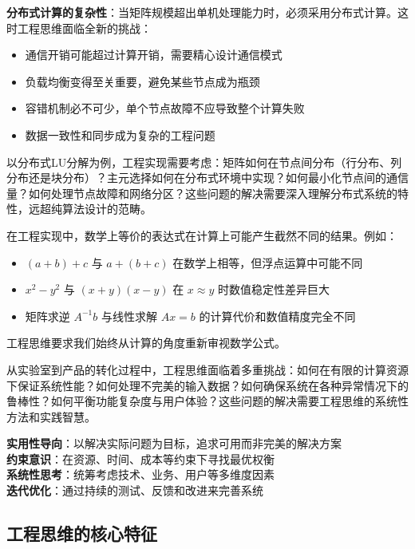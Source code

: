 \textbf{分布式计算的复杂性}：当矩阵规模超出单机处理能力时，必须采用分布式计算。这时工程思维面临全新的挑战：
\begin{itemize}
\item 通信开销可能超过计算开销，需要精心设计通信模式
\item 负载均衡变得至关重要，避免某些节点成为瓶颈
\item 容错机制必不可少，单个节点故障不应导致整个计算失败
\item 数据一致性和同步成为复杂的工程问题
\end{itemize}

以分布式LU分解为例，工程实现需要考虑：矩阵如何在节点间分布（行分布、列分布还是块分布）？主元选择如何在分布式环境中实现？如何最小化节点间的通信量？如何处理节点故障和网络分区？这些问题的解决需要深入理解分布式系统的特性，远超纯算法设计的范畴。

\begin{tcolorbox}[colback=red!5!white,colframe=red!75!black,title=警示：数学等价≠计算等价]
在工程实现中，数学上等价的表达式在计算上可能产生截然不同的结果。例如：
\begin{itemize}
\item $(a+b)+c$ 与 $a+(b+c)$ 在数学上相等，但浮点运算中可能不同
\item $x^2-y^2$ 与 $(x+y)(x-y)$ 在 $x \approx y$ 时数值稳定性差异巨大
\item 矩阵求逆 $A^{-1}b$ 与线性求解 $Ax=b$ 的计算代价和数值精度完全不同
\end{itemize}
工程思维要求我们始终从计算的角度重新审视数学公式。
\end{tcolorbox}

从实验室到产品的转化过程中，工程思维面临着多重挑战：如何在有限的计算资源下保证系统性能？如何处理不完美的输入数据？如何确保系统在各种异常情况下的鲁棒性？如何平衡功能复杂度与用户体验？这些问题的解决需要工程思维的系统性方法和实践智慧。

\begin{tcolorbox}[colback=orange!5!white,colframe=orange!75!black,title=核心概念：工程思维的四大支柱]
\textbf{实用性导向}：以解决实际问题为目标，追求可用而非完美的解决方案\\
\textbf{约束意识}：在资源、时间、成本等约束下寻找最优权衡\\
\textbf{系统性思考}：统筹考虑技术、业务、用户等多维度因素\\
\textbf{迭代优化}：通过持续的测试、反馈和改进来完善系统
\end{tcolorbox}

\subsection{工程思维的核心特征}

